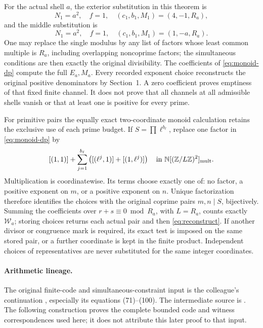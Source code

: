 \documentclass[11pt]{article}
\theoremstyle{definition}\newtheorem{definition}[theorem]{Definition}
\theoremstyle{remark}\newtheorem{remark}[theorem]{Remark}
\newcommand{\Z}{\mathbb Z}\newcommand{\Q}{\mathbb Q}
\newcommand{\N}{\mathbb N}
\begin{document}
For the actual shell \(a\), the exterior substitution in
this theorem is
\[
 N_1=a^2,\quad f=1,\quad(c_1,b_1,M_1)=(4,-1,R_a),
\]
and the middle substitution is
\[
 N_1=a^2,\quad f=1,\quad(c_1,b_1,M_1)=(1,-a,R_a).
\]
One may replace the single modulus by any list of factors
whose least common multiple is \(R_a\), including
overlapping noncoprime factors; the simultaneous conditions
are then exactly the original divisibility.  The coefficients
of \eqref{eq:monoid-dp} compute the full \(E_a,M_a\).
Every recorded exponent choice reconstructs the original
positive denominators by Section~1.  A zero coefficient
proves emptiness of that fixed finite channel.  It does
not prove that all channels at all admissible shells
vanish or that at least one is positive for every prime.

For primitive pairs the equally exact two-coordinate
monoid calculation retains the exclusive use of each
prime budget.  If \(S=\prod\ell^{b_\ell}\), replace one
factor in \eqref{eq:monoid-dp} by
\[
 [(1,1)]+\sum_{j=1}^{b_\ell}
       \left([(\ell^j,1)]+[(1,\ell^j)]\right)
       \quad\text{in }\N[(\Z/L\Z)^2]_{\rm mult}.
\]
Multiplication is coordinatewise.  Its terms choose
exactly one of: no factor, a positive exponent on \(m\),
or a positive exponent on \(n\).  Unique factorization
therefore identifies the choices with the original
coprime pairs \(m,n\mid S\), bijectively.  Summing the
coefficients over \(r+s\equiv0\bmod R_a\), with
\(L=R_a\), counts exactly \(\mathcal W_a\); storing choices
returns each actual pair and then
\eqref{eq:reconstruct}.  If another divisor or congruence
mark is required, its exact test is imposed on the same
stored pair, or a further coordinate is kept in the
finite product.  Independent choices of representatives
are never substituted for the same integer coordinates.


\paragraph{Arithmetic lineage.}
The original finite-code and simultaneous-constraint input is the colleague's
continuation \cite{UmbrellaContribution}, especially its equations (71)--(100).
The intermediate source is \cite{PrimewiseCoordinates}.
The following construction proves the complete bounded code and witness
correspondences used here; it does not attribute this later proof to that input.



\end{document}
